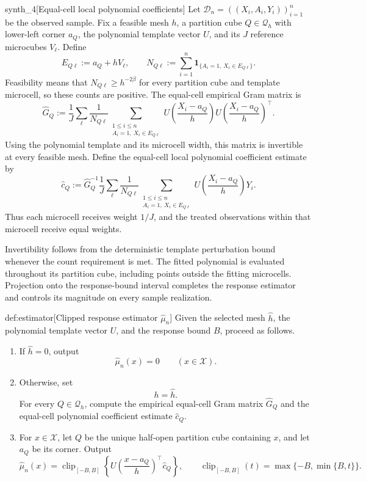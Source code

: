 \documentclass[11pt]{article}
\begin{document}
\begin{definitionv}{synth_4}[Equal-cell local polynomial coefficients]
Let \(\mathcal D_n=((X_i,A_i,Y_i))_{i=1}^n\) be the observed sample. Fix a feasible mesh \(h\), a partition cube \(Q\in\mathcal Q_h\) with lower-left corner \(a_Q\), the polynomial template vector \(U\), and its \(J\) reference microcubes \(V_\ell\). Define
\[
E_{Q\ell}:=a_Q+hV_\ell,
\qquad
N_{Q\ell}:=\sum_{i=1}^n
\mathbf 1_{\{A_i=1,\ X_i\in E_{Q\ell}\}}.
\]
Feasibility means that \(N_{Q\ell}\ge h^{-2\beta}\) for every partition cube and template microcell, so these counts are positive. The equal-cell empirical Gram matrix is
\[
\widehat G_Q:=
\frac1J\sum_\ell\frac1{N_{Q\ell}}
\sum_{\substack{1\le i\le n\\ A_i=1,\ X_i\in E_{Q\ell}}}
U\!\left(\frac{X_i-a_Q}{h}\right)
U\!\left(\frac{X_i-a_Q}{h}\right)^\top.
\]
Using the polynomial template and its microcell width, this matrix is invertible at every feasible mesh. Define the equal-cell local polynomial coefficient estimate by
\[
\widehat c_Q:=
\widehat G_Q^{-1}
\frac1J\sum_\ell\frac1{N_{Q\ell}}
\sum_{\substack{1\le i\le n\\ A_i=1,\ X_i\in E_{Q\ell}}}
U\!\left(\frac{X_i-a_Q}{h}\right)Y_i.
\]
Thus each microcell receives weight \(1/J\), and the treated observations within that microcell receive equal weights.
\end{definitionv}

Invertibility follows from the deterministic template perturbation bound whenever the count requirement is met. The fitted polynomial is evaluated throughout its partition cube, including points outside the fitting microcells. Projection onto the response-bound interval completes the response estimator  and controls its magnitude on every sample realization.

\begin{algorithmv}{def:estimator}[Clipped response estimator $\widehat\mu_n$]
Given the selected mesh \(\widehat h\), the polynomial template vector \(U\), and the response bound \(B\), proceed as follows.
\begin{enumerate}
\item If \(\widehat h=0\), output
\[
\widehat\mu_n(x)=0
\qquad(x\in\mathcal X).
\]
\item Otherwise, set
\[
h=\widehat h.
\]
For every \(Q\in\mathcal Q_h\), compute the empirical equal-cell Gram matrix \(\widehat G_Q\) and the equal-cell polynomial coefficient estimate \(\widehat c_Q\).
\item For \(x\in\mathcal X\), let \(Q\) be the unique half-open partition cube containing \(x\), and let \(a_Q\) be its corner. Output
\[
\widehat\mu_n(x)
=
\operatorname{clip}_{[-B,B]}
\left\{
U\left(\frac{x-a_Q}{h}\right)^\top\widehat c_Q
\right\},
\qquad
\operatorname{clip}_{[-B,B]}(t)=\max\{-B,\min\{B,t\}\}.
\]
\end{enumerate}
\end{algorithmv}
\end{document}
